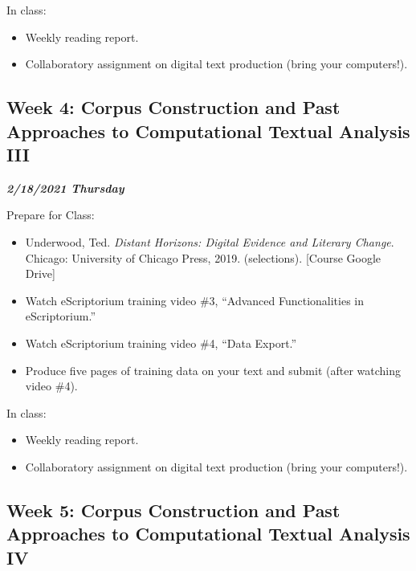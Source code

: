 \documentclass[
]{book}
\providecommand{\tightlist}{%
  \setlength{\itemsep}{0pt}\setlength{\parskip}{0pt}}
\begin{document}
In class:

\begin{itemize}
\tightlist
\item
  Weekly reading report.
\item
  Collaboratory assignment on digital text production (bring your computers!).
\end{itemize}

\hypertarget{week-4-corpus-construction-and-past-approaches-to-computational-textual-analysis-iii}{%
\subsection{Week 4: Corpus Construction and Past Approaches to Computational Textual Analysis III}\label{week-4-corpus-construction-and-past-approaches-to-computational-textual-analysis-iii}}

\textbf{\emph{2/18/2021 Thursday}}

Prepare for Class:

\begin{itemize}
\tightlist
\item
  Underwood, Ted. \emph{Distant Horizons: Digital Evidence and Literary Change}. Chicago: University of Chicago Press, 2019. (selections). {[}Course Google Drive{]}
\item
  Watch eScriptorium training video \#3, ``Advanced Functionalities in eScriptorium.''
\item
  Watch eScriptorium training video \#4, ``Data Export.''
\item
  Produce five pages of training data on your text and submit (after watching video \#4).
\end{itemize}

In class:

\begin{itemize}
\tightlist
\item
  Weekly reading report.
\item
  Collaboratory assignment on digital text production (bring your computers!).
\end{itemize}

\hypertarget{week-5-corpus-construction-and-past-approaches-to-computational-textual-analysis-iv}{%
\subsection{Week 5: Corpus Construction and Past Approaches to Computational Textual Analysis IV}\label{week-5-corpus-construction-and-past-approaches-to-computational-textual-analysis-iv}}
\end{document}

